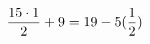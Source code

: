 \documentclass[preview]{standalone}
\begin{document}
\begin{align*}
\special{dvisvgm:raw <g id='unique000'>}\frac{15 \cdot 1}{2} + 9 = 19 - 5 (\frac{1}{2})\special{dvisvgm:raw </g>}
\end{align*}
\end{document}
